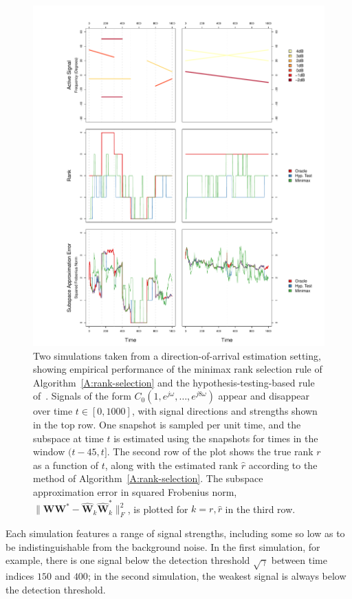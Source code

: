 \documentclass[final]{IEEEtran} %
\newcommand{\matrixsymbol}{\boldsymbol}
\newcommand{\mW}{\matrixsymbol{W}}
\newcommand{\mhW}{\widehat{\matrixsymbol{W}}}
\begin{document}
\begin{figure}
    \centering
    \includegraphics[width=2.1\columnwidth]{plots/doa-sim}
    \caption{\label{F:simulations} Two simulations taken from a direction-of-arrival estimation setting, showing empirical performance of the minimax rank selection rule of Algorithm~\ref{A:rank-selection} and the hypothesis-testing-based rule of~\cite{kritchman2008dnc}.  Signals of the form $C_0 ( 1, e^{j \omega}, \ldots, e^{j 8 \omega})$ appear and disappear over time $t \in [0,1000]$, with signal directions and strengths shown in the top row.  One snapshot is sampled per unit time, and the subspace at time $t$ is estimated using the snapshots for times in the window $(t-45,t]$.  The second row of the plot shows the true rank $r$ as a function of $t$, along with the estimated rank $\hat r$ according to the method of Algorithm~\ref{A:rank-selection}.  The subspace approximation error in squared Frobenius norm, $\|\mW \mW^\ast - \mhW_k \mhW^\ast_k \|_F^2$, is plotted for $k = r, \hat r$ in the third row.}
\end{figure}

Each simulation features a range of signal strengths, including some so low as to be indistinguishable from the background noise.  In the first simulation, for example, there is one signal below the detection threshold $\sqrt{\gamma}$ between time indices $150$ and $400$; in the second simulation, the weakest signal is always below the detection threshold.
\end{document}

